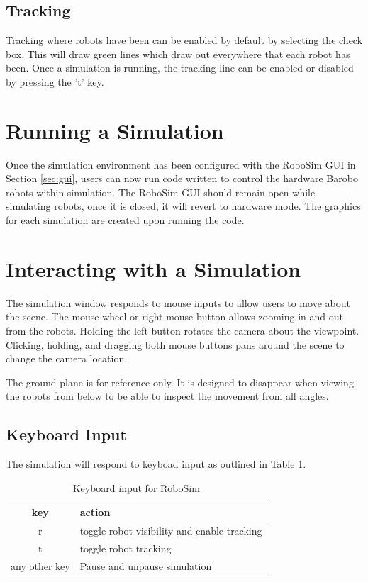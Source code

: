 \documentclass{article}
\begin{document}
\subsection{Tracking}
Tracking where robots have been can be enabled by default by selecting the
check box.  This will draw green lines which draw out everywhere that each robot
has been.  Once a simulation is running, the tracking line can be enabled or
disabled by pressing the 't' key.

\section{Running a Simulation}
Once the simulation environment has been configured with the RoboSim GUI in
Section \ref{sec:gui}, users can now run code written to control the hardware
Barobo robots within simulation.  The RoboSim GUI should remain open while
simulating robots, once it is closed, it will revert to hardware mode.  The
graphics for each simulation are created upon running the code.

\section{Interacting with a Simulation}
The simulation window responds to mouse inputs to allow users to move about the
scene.  The mouse wheel or right mouse button allows zooming in and out from the
robots.  Holding the left button rotates the camera about the viewpoint.
Clicking, holding, and dragging both mouse buttons pans around the scene to
change the camera location.

The ground plane is for reference only.  It is designed to disappear when
viewing the robots from below to be able to inspect the movement from all
angles.

\subsection{Keyboard Input}
The simulation will respond to keyboad input as outlined in Table
\ref{tab:keys}.

\begin{table}[H]
	\begin{center}
	\begin{tabular}{c | l }
		\hline \hline
		\textbf{key} & \textbf{action} \\ \hline
		r & toggle robot visibility and enable tracking \\
		t & toggle robot tracking \\
		any other key & Pause and unpause simulation \\
		\hline \hline
	\end{tabular}
	\caption{Keyboard input for RoboSim}
	\label{tab:keys}
	\end{center}
\end{table}
\end{document}
